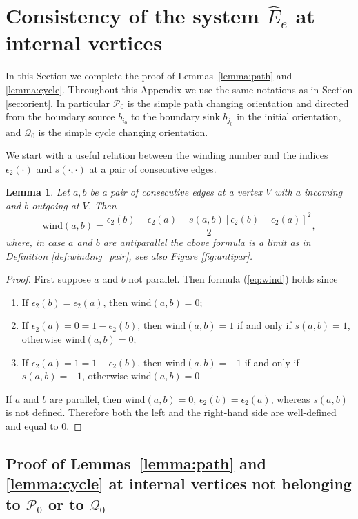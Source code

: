 \documentclass[11pt]{amsart}
\theoremstyle{plain}
\numberwithin{equation}{section}
\newtheorem{lemma}[theorem]{Lemma}
\begin{document}
\appendix

\section{Consistency of the system $\hat E_e$ at internal vertices}\label{app:orient}

In this Section we complete the proof of Lemmas~\ref{lemma:path} and \ref{lemma:cycle}.
Throughout this Appendix we use the same notations as in Section \ref{sec:orient}. In particular $\mathcal P_0$ is the simple path changing orientation and directed from the boundary source $b_{i_0}$ to the boundary sink $b_{j_0}$ in the initial orientation, and $\mathcal Q_0$ is the simple cycle changing orientation. 

We  start with a useful relation between the winding number and the indices $\epsilon_2(\cdot)$ and $s(\cdot,\cdot)$ at a pair of consecutive edges. 
	
\begin{lemma}
\label{lem:wind}
Let $a,b$ be a pair of consecutive edges at a vertex $V$ with $a$ incoming and $b$ outgoing at $V$. Then
\begin{equation}
\label{eq:wind}
\mbox{wind}(a,b) = \frac{\epsilon_2(b)-\epsilon_2(a) + s(a,b)[\epsilon_2(b)-\epsilon_2(a)]^2}{2},
\end{equation}
where, in case $a$ and $b$ are antiparallel the above formula is a limit as in Definition \ref{def:winding_pair}, see also Figure \ref{fig:antipar}.
\end{lemma}
\begin{proof}
First suppose $a$ and $b$ not parallel. Then formula (\ref{eq:wind}) holds since
\begin{enumerate} 
\item If $\epsilon_2(b)=\epsilon_2(a)$, then $\mbox{wind}(a,b)=0$;
\item If $\epsilon_2(a)=0=1-\epsilon_2(b)$, then $\mbox{wind}(a,b)=1$ if and only if $s(a,b)=1$, otherwise $\mbox{wind}(a,b)=0$;  
\item If $\epsilon_2(a)=1=1-\epsilon_2(b)$, then $\mbox{wind}(a,b)=-1$ if and only if $s(a,b)=-1$, otherwise $\mbox{wind}(a,b)=0$
\end{enumerate}
If $a$ and $b$ are parallel, then $\mbox{wind}(a,b)=0$, $\epsilon_2(b)=\epsilon_2(a)$, whereas $s(a,b)$ is not defined. Therefore both the left and the right-hand side are well-defined and equal to 0.
\end{proof}

\subsection{Proof of Lemmas~\ref{lemma:path} and \ref{lemma:cycle} at internal vertices not belonging to $\mathcal P_0$ or to $\mathcal Q_0$}
\end{document}
